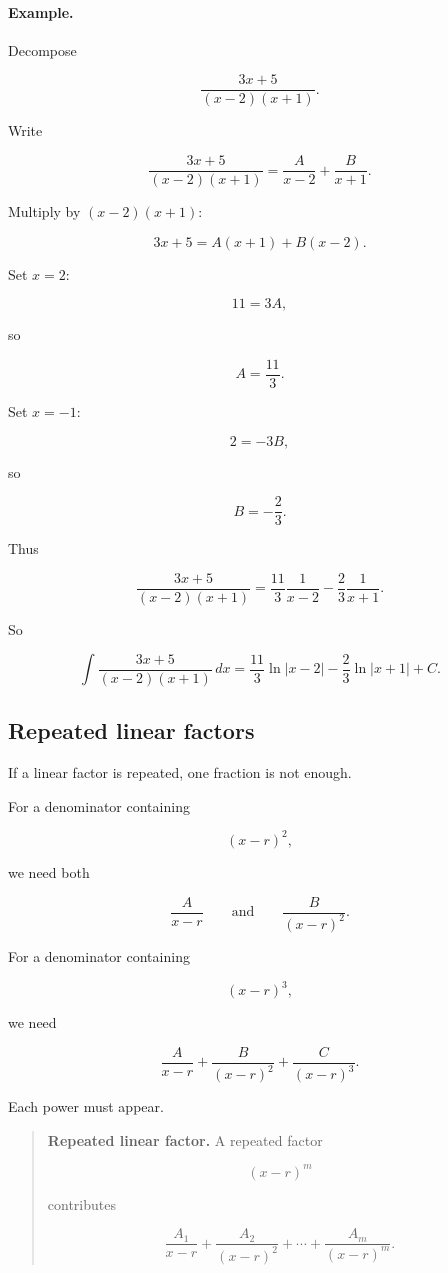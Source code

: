 \paragraph{Example.}
Decompose

\[
\frac{3x+5}{(x-2)(x+1)}.
\]

Write

\[
\frac{3x+5}{(x-2)(x+1)}
=
\frac{A}{x-2}+\frac{B}{x+1}.
\]

Multiply by \((x-2)(x+1)\):

\[
3x+5=A(x+1)+B(x-2).
\]

Set \(x=2\):

\[
11=3A,
\]

so

\[
A=\frac{11}{3}.
\]

Set \(x=-1\):

\[
2=-3B,
\]

so

\[
B=-\frac23.
\]

Thus

\[
\frac{3x+5}{(x-2)(x+1)}
=
\frac{11}{3}\frac{1}{x-2}
-
\frac{2}{3}\frac{1}{x+1}.
\]

So

\[
\boxed{
\int \frac{3x+5}{(x-2)(x+1)}\,dx
=
\frac{11}{3}\ln|x-2|
-
\frac{2}{3}\ln|x+1|
+C.
}
\]

\subsection{Repeated linear factors}
\label{subsec:repeated-linear-factors}

If a linear factor is repeated, one fraction is not enough.

For a denominator containing

\[
(x-r)^2,
\]

we need both

\[
\frac{A}{x-r}
\qquad\text{and}\qquad
\frac{B}{(x-r)^2}.
\]

For a denominator containing

\[
(x-r)^3,
\]

we need

\[
\frac{A}{x-r}
+
\frac{B}{(x-r)^2}
+
\frac{C}{(x-r)^3}.
\]

Each power must appear.

\begin{quote}
\textbf{Repeated linear factor.}
A repeated factor

\[
(x-r)^m
\]

contributes

\[
\frac{A_1}{x-r}
+
\frac{A_2}{(x-r)^2}
+\cdots+
\frac{A_m}{(x-r)^m}.
\]
\end{quote}

